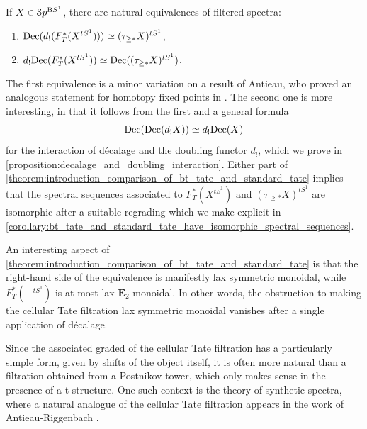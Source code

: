 \documentclass[oneside,a4paper]{amsart}
\begin{document}
\begin{theorem}[{\ref{theorem:decalage_of_evenification_of_bhatt_lurie_tate_is_the_tate_of_postnikov}, \ref{corollary:decalaged_cellular_tate_is_double_of_decalaged_postnikov_tate}}]
\label{theorem:introduction_comparison_of_bt_tate_and_standard_tate}
If $X \in \EuScript{S}p^{\mathrm{B}S^{1}}$, there are natural equivalences of filtered spectra: 
\begin{enumerate}
    \item $\mathrm{Dec}(d_{!}(F_{T}^{\ast}(X^{tS^{1}}))) \simeq (\tau_{\geq \ast} X)^{tS^{1}}$, 
    \item $d_{!} \mathrm{Dec}(F_{T}^{\ast}(X^{tS^{1}})) \simeq \mathrm{Dec}((\tau_{\geq \ast} X)^{tS^{1}})$.
\end{enumerate}
\end{theorem}
The first equivalence is a minor variation on a result of Antieau, who proved an analogous statement for homotopy fixed points in \cite[{Proposition 9.2}]{antieau:decalage}. The second one is more interesting, in that it follows from the first and a general formula 
\[
\mathrm{Dec}(\mathrm{Dec}(d_{!} X)) \simeq d_{!} \mathrm{Dec}(X)
\]
for the interaction of d\'{e}calage and the doubling functor $d_{!}$, which we prove in \cref{proposition:decalage_and_doubling_interaction}. Either part of \cref{theorem:introduction_comparison_of_bt_tate_and_standard_tate} implies that the spectral sequences associated to $F_{T}^{\ast}(X^{tS^{1}})$ and $(\tau_{\geq \ast} X)^{tS^{1}}$ are isomorphic after a suitable regrading which we make explicit in \cref{corollary:bt_tate_and_standard_tate_have_isomorphic_spectral_sequences}. 

An interesting aspect of \cref{theorem:introduction_comparison_of_bt_tate_and_standard_tate} is that the right-hand side of the equivalence is manifestly lax symmetric monoidal, while $F_{T}^{\ast}(-^{tS^{1}})$ is at most lax $\mathbf{E}_{2}$-monoidal. In other words, the obstruction to making the cellular Tate filtration lax symmetric monoidal vanishes after a single application of d\'{e}calage. 

Since the associated graded of the cellular Tate filtration has a particularly simple form, given by shifts of the object itself, it is often more natural than a filtration obtained from a Postnikov tower, which only makes sense in the presence of a t-structure. One such context is the theory of synthetic spectra, where a natural analogue of the cellular Tate filtration appears in the work of Antieau-Riggenbach \cite[{Proof of Lemma 2.75}]{antieau2024cyclotomic}. 
\end{document}
